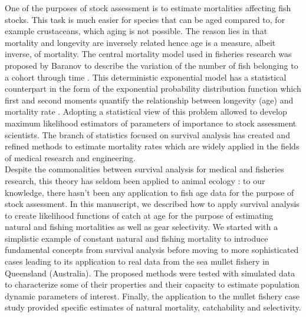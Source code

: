 One of the purposes of stock assessment is to estimate mortalities affecting fish stocks. This task is much easier for species that can be aged compared to, for example crustaceans, which aging is not possible. The reason lies in that mortality and longevity are inversely related hence age is a measure, albeit inverse, of mortality. The central mortality model used in fisheries research was proposed by Baranov to describe the variation of the number of fish belonging to a cohort through time \citep{quin99b}. This deterministic exponential model has a statistical counterpart in the form of the exponential probability distribution function which first and second moments quantify the relationship between longevity (age) and mortality rate \citep{cow98b}. Adopting a statistical view of this problem allowed to develop maximum likelihood estimators \citep{Burnb03} of parameters of importance to stock assessment scientists. The branch of statistics focused on survival analysis has created and refined methods to estimate mortality rates \citep{cox84b} which are widely applied in the fields of medical research and engineering. \\ 

Despite the commonalities between survival analysis for medical and fisheries research, this theory has seldom been applied to animal ecology \citep{Pollock1989}: to our knowledge, there hasn't been any application to fish age data for the purpose of stock assessment. In this manuscript, we described how to apply survival analysis to create likelihood functions of catch at age for the purpose of estimating natural and fishing mortalities as well as gear selectivity. We started with a simplistic example of constant natural and fishing mortality to introduce fundamental concepts from survival analysis before moving to more sophisticated cases leading to its application to real data from the sea mullet fishery in Queensland (Australia). The proposed methods were tested with simulated data to characterize some of their properties and their capacity to estimate population dynamic parameters of interest. Finally, the application to the mullet fishery case study provided specific estimates of natural mortality, catchability and selectivity. \\
